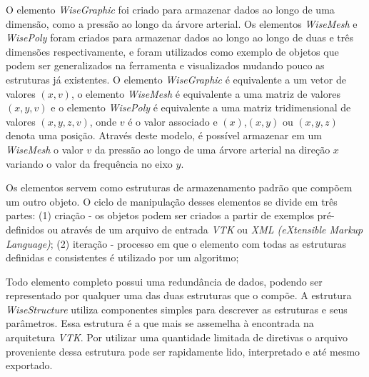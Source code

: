 
O elemento \textit{WiseGraphic} foi criado para armazenar dados ao longo de uma dimensão, como a pressão ao longo da árvore arterial. Os elementos \textit{WiseMesh} e \textit{WisePoly} foram criados para armazenar dados ao longo ao longo de duas e três dimensões  respectivamente,  e foram utilizados como exemplo de objetos que podem ser generalizados na ferramenta e visualizados mudando pouco as estruturas já existentes. O elemento \textit{WiseGraphic} é equivalente a um vetor de valores $(x,v)$, o elemento \textit{WiseMesh} é equivalente a uma matriz de valores $(x,y,v)$ e o elemento \textit{WisePoly} é equivalente a uma matriz tridimensional de valores $(x,y,z,v)$, onde $v$ é o valor associado e $(x)$,$(x,y)$ ou $(x,y,z)$ denota uma posição. Através deste modelo, é possível armazenar em um \textit{WiseMesh} o valor $v$ da pressão ao longo de uma árvore arterial na direção $x$ variando o valor da frequência no eixo $y$.

Os elementos servem como estruturas de armazenamento padrão que compõem um outro objeto. O ciclo de manipulação desses elementos se divide em três partes: (1) criação - os objetos podem ser criados a partir de exemplos pré-definidos ou através de um arquivo de entrada \textit{VTK} ou \textit{XML (eXtensible Markup Language)}; (2) iteração - processo em que o elemento com todas as estruturas definidas e consistentes é utilizado por um algoritmo; 

Todo elemento completo possui uma redundância de dados, podendo ser representado por qualquer uma das duas estruturas que o compõe. A estrutura \textit{WiseStructure} utiliza componentes simples para descrever as estruturas e seus parâmetros. Essa estrutura é a que mais se assemelha à encontrada na arquitetura \textit{VTK}. Por utilizar uma quantidade limitada de diretivas o arquivo proveniente dessa estrutura pode ser rapidamente lido, interpretado e até mesmo exportado.

